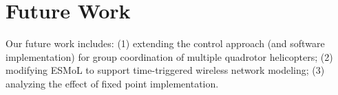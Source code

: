 \documentclass{acm_proc_article-sp}
\begin{document}
\section{Future Work}

Our future work includes: (1) extending the control approach (and software implementation) for group coordination of multiple quadrotor helicopters; (2) modifying ESMoL to support time-triggered wireless network modeling; (3) analyzing the effect of fixed point implementation.






\end{document}
